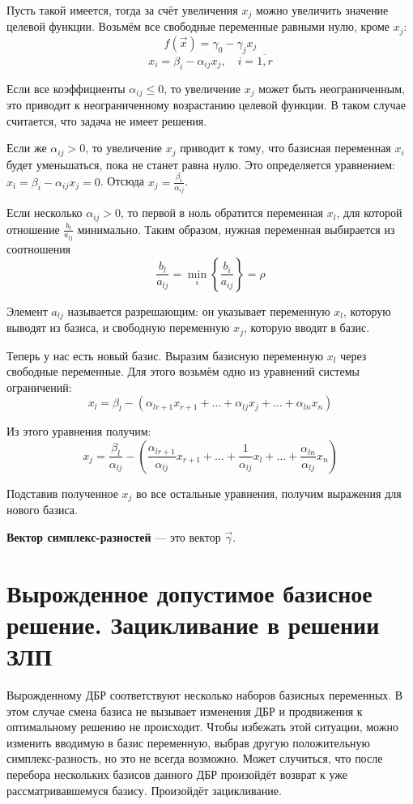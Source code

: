 \documentclass[17pt]{extarticle}
\begin{document}
Пусть такой имеется, тогда за счёт увеличения \( x_j \) можно увеличить значение целевой функции. Возьмём все свободные переменные равными нулю, кроме \( x_j \):
\[
    f(\vec{x}) = \gamma_0 - \gamma_j x_j
\]
\[
    x_i = \beta_i - \alpha_{ij} x_j, \quad i = \overline{1,r}
\]

Если все коэффициенты \( \alpha_{ij} \le 0 \), то увеличение \( x_j \) может быть неограниченным, это приводит к неограниченному возрастанию целевой функции. В таком случае считается, что задача не имеет решения.

Если же \( \alpha_{ij} > 0 \), то увеличение \( x_j \) приводит к тому, что базисная переменная \( x_i \) будет уменьшаться, пока не станет равна нулю. Это определяется уравнением: \( x_i = \beta_i - \alpha_{ij} x_j = 0 \). Отсюда \( x_j = \frac{\beta_i}{\alpha_{ij}} \).

Если несколько \( \alpha_{ij} > 0 \), то первой в ноль обратится переменная \( x_l \), для которой отношение \( \frac{b_l}{a_{lj}} \) минимально. Таким образом, нужная переменная выбирается из соотношения
\[
    \frac{b_l}{a_{lj}} = \min\limits_i \left\{ \frac{b_i}{a_{ij}} \right\} = \rho
\]

Элемент \( a_{lj} \) называется разрешающим: он указывает переменную \( x_l \), которую выводят из базиса, и свободную переменную \( x_j \), которую вводят в базис.

Теперь у нас есть новый базис. Выразим базисную переменную \( x_l \) через свободные переменные. Для этого возьмём одно из уравнений системы ограничений:
\[
    x_l = \beta_l - (\alpha_{l r+1}x_{r+1} + \dots + \alpha_{lj}x_j + \dots + \alpha_{ln}x_n)
\]

Из этого уравнения получим:
\[
    x_j = \frac{\beta_l}{\alpha_{lj}} - \left( \frac{\alpha_{l r+1}}{\alpha_{lj}}x_{r+1} + \dots + \frac{1}{\alpha_{lj}}x_l + \dots + \frac{\alpha_{ln}}{\alpha_{lj}}x_n \right)
\]

Подставив полученное \( x_j \) во все остальные уравнения, получим выражения для нового базиса.

\textbf{Вектор симплекс-разностей} — это вектор \( \vec{\gamma} \).




\section{Вырожденное допустимое базисное решение. Зацикливание в решении ЗЛП}

Вырожденному ДБР соответствуют несколько наборов базисных переменных. В этом случае смена базиса не вызывает изменения ДБР и продвижения к оптимальному решению не происходит. Чтобы избежать этой ситуации, можно изменить вводимую в базис переменную, выбрав другую положительную симплекс-разность, но это не всегда возможно. Может случиться, что после перебора нескольких базисов данного ДБР произойдёт возврат к уже рассматривавшемуся базису. Произойдёт зацикливание.
\end{document}
